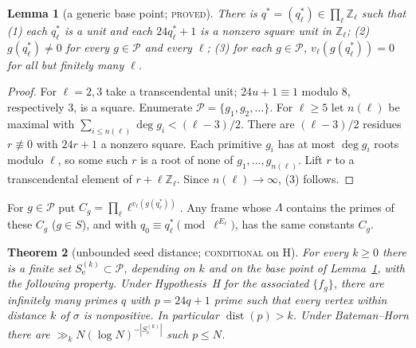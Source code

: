\documentclass[11pt,reqno]{amsart}
\newtheorem{theorem}{Theorem}[section]
\newtheorem{lemma}[theorem]{Lemma}
\theoremstyle{definition}
\newcommand{\Z}{\mathbb Z}
\newcommand{\cP}{\mathcal P}
\newcommand{\Se}{S_{\mathrm e}}
\newcommand{\dist}{\operatorname{dist}}
\newcommand{\status}[1]{\textsc{#1}}
\begin{document}
\begin{lemma}[a generic base point; \status{proved}]\label{lem:generic}
There is $q^*=(q^*_\ell)\in\prod_\ell\Z_\ell$ such that (1) each $q^*_\ell$
is a unit and each $24q^*_\ell+1$ is a nonzero square unit in $\Z_\ell$; (2) $g(q^*_\ell)\ne0$
for every $g\in\cP$ and every $\ell$; (3) for each $g\in\cP$,
$v_\ell(g(q^*_\ell))=0$ for all but finitely many $\ell$.
\end{lemma}

\begin{proof}
For $\ell=2,3$ take a transcendental unit; $24u+1\equiv1$ modulo $8$,
respectively $3$, is a square.  Enumerate $\cP=\{g_1,g_2,\dots\}$.  For $\ell\ge5$ let
$n(\ell)$ be maximal with $\sum_{i\le n(\ell)}\deg g_i<(\ell-3)/2$.  There
are $(\ell-3)/2$ residues $r\not\equiv0$ with $24r+1$ a nonzero square.
Each primitive $g_i$ has at most $\deg g_i$ roots modulo $\ell$, so some such
$r$ is a root of none of $g_1,\dots,g_{n(\ell)}$.  Lift $r$ to a transcendental
element of $r+\ell\Z_\ell$.  Since $n(\ell)\to\infty$, (3) follows.
\end{proof}

For $g\in\cP$ put $C_g=\prod_\ell\ell^{v_\ell(g(q^*_\ell))}$.  Any frame
whose $\Lambda$ contains the primes of these $C_g$ ($g\in S$), and with
$q_0\equiv q^*_\ell\pmod{\ell^{E_\ell}}$, has the same constants $C_g$.

\begin{theorem}[unbounded seed distance; \status{conditional} on H]\label{thm:unbounded}
For every $k\ge0$ there is a finite set $\Se^{(k)}\subset\cP$, depending on
$k$ and on the base point of Lemma~\ref{lem:generic}, with the following
property.  Under Hypothesis~H for the associated
$\{f_g\}$, there are infinitely many primes $q$ with $p=24q+1$ prime such
that every vertex within distance $k$ of $\sigma$ is nonpositive.  In
particular $\dist(p)>k$.  Under Bateman--Horn there are
$\gg_kN(\log N)^{-|\Se^{(k)}|}$ such $p\le N$.
\end{theorem}
\end{document}
